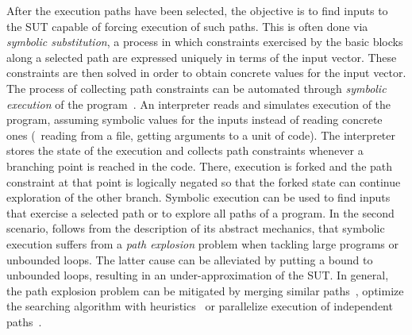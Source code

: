 After the execution paths have been selected, the objective is to find inputs to
the \ac{SUT} capable of forcing execution of such paths. This is often done via
\emph{symbolic substitution}, a process in which constraints exercised by the
basic blocks along a selected path are expressed uniquely in terms of the input
vector. These constraints are then solved in order to obtain concrete values for
the input vector. The process of collecting path constraints can be automated
through \emph{symbolic execution} of the program~\cite{Clarke1976AST,
Boyer1975SELECTaFS, King1976SymbolicEA}. An interpreter reads and simulates
execution of the program, assuming symbolic values for the inputs instead of
reading concrete ones (\eg~reading from a file, getting arguments to a unit of
code). The interpreter stores the state of the execution and collects path
constraints whenever a branching point is reached in the code. There, execution
is forked and the path constraint at that point is logically negated so that the
forked state can continue exploration of the other branch. Symbolic execution
can be used to find inputs that exercise a selected path or to explore all paths
of a program. In the second scenario, follows from the description of its
abstract mechanics, that symbolic execution suffers from a \emph{path explosion}
problem when tackling large programs or unbounded loops.  The latter cause can
be alleviated by putting a bound to unbounded loops, resulting in an
under-approximation of the \ac{SUT}. In general, the path explosion problem can
be mitigated by merging similar paths~\cite{Kuznetsov12efficientstate}, optimize
the searching algorithm with heuristics~\cite{Burnim2008HeuristicsFS, Ma2011DSE}
or parallelize execution of independent paths~\cite{Staats2010PSE}.

